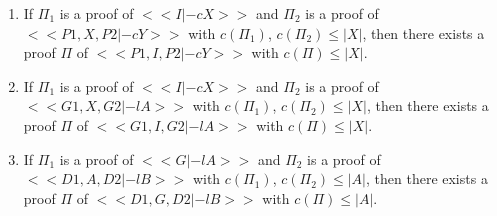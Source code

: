 
\begin{lemma}
  \label{lem:cut-reduction}
  \begin{enumerate}
  \item If $\Pi_1$ is a proof of $<<I |-c X>>$ and $\Pi_2$ is a proof of $<<P1,X,P2 |-c Y>>$
        with $c(\Pi_1)$, $c(\Pi_2)\leq |X|$, then there exists a proof $\Pi$ of
        $<<P1, I, P2 |-c Y>>$ with $c(\Pi)\leq |X|$.
  \item If $\Pi_1$ is a proof of $<<I |-c X>>$ and $\Pi_2$ is a proof of $<<G1,X,G2 |-l A>>$
        with $c(\Pi_1)$, $c(\Pi_2)\leq |X|$, then there exists a proof $\Pi$ of
        $<<G1, I, G2 |-l A>>$ with $c(\Pi)\leq |X|$.
  \item If $\Pi_1$ is a proof of $<<G |-l A>>$ and $\Pi_2$ is a proof of $<<D1,A,D2 |-l B>>$
        with $c(\Pi_1)$, $c(\Pi_2)\leq |A|$, then there exists a proof $\Pi$ of
        $<<D1, G, D2 |-l B>>$ with $c(\Pi)\leq |A|$.
  \end{enumerate}
\end{lemma}

